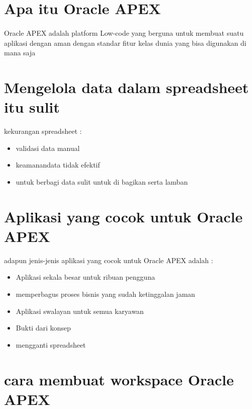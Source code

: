 \documentclass[12pt]{article}
\begin{document}
\section*{Apa itu Oracle APEX}
\paragraph{} Oracle APEX adalah platform Low-code yang berguna untuk membuat suatu aplikasi dengan aman dengan standar fitur kelas dunia yang bisa digunakan di mana saja


\section{Mengelola data dalam spreadsheet itu sulit}
kekurangan spreadsheet :

\begin{itemize}
	\item validasi data manual
	\item keamanandata tidak efektif
	\item untuk berbagi data sulit untuk di bagikan serta lamban
	
\end{itemize}


\section{Aplikasi yang cocok untuk Oracle APEX}

adapun jenis-jenis aplikasi yang cocok untuk Oracle APEX adalah :
\begin{itemize}
	\item Aplikasi sekala besar untuk ribuan pengguna
	\item memperbagus proses bisnis yang sudah ketinggalan jaman
	\item Aplikasi swalayan untuk semua karyawan
	\item Bukti dari konsep
	\item mengganti spreadsheet
	
\end{itemize}

\section{cara membuat workspace Oracle APEX}
\end{document}
